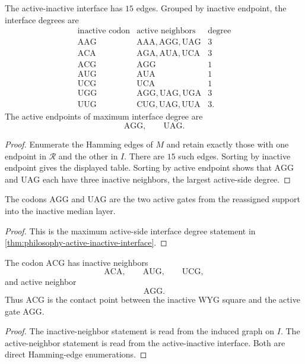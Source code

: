 \begin{theorem}
\label{thm:philosophy-active-inactive-interface}
The active-inactive interface has $15$ edges. Grouped by inactive
endpoint, the interface degrees are
$$
\begin{array}{c|l|r}
  \text{inactive codon} & \text{active neighbors} & \text{degree}\\
  \hline
  \mathrm{AAG} & \mathrm{AAA},\mathrm{AGG},\mathrm{UAG} & 3\\
  \mathrm{ACA} & \mathrm{AGA},\mathrm{AUA},\mathrm{UCA} & 3\\
  \mathrm{ACG} & \mathrm{AGG} & 1\\
  \mathrm{AUG} & \mathrm{AUA} & 1\\
  \mathrm{UCG} & \mathrm{UCA} & 1\\
  \mathrm{UGG} & \mathrm{AGG},\mathrm{UAG},\mathrm{UGA} & 3\\
  \mathrm{UUG} & \mathrm{CUG},\mathrm{UAG},\mathrm{UUA} & 3.
\end{array}
$$
The active endpoints of maximum interface degree are
$$
  \mathrm{AGG},\qquad \mathrm{UAG}.
$$
\end{theorem}
\begin{proof}
Enumerate the Hamming edges of $M$ and retain exactly those with one
endpoint in $\mathcal{R}$ and the other in $I$. There are $15$ such
edges. Sorting by inactive endpoint gives the displayed table. Sorting
by active endpoint shows that $\mathrm{AGG}$ and $\mathrm{UAG}$ each
have three inactive neighbors, the largest active-side degree.
\end{proof}

\begin{corollary}
\label{cor:philosophy-double-gate-inactive-layer}
The codons $\mathrm{AGG}$ and $\mathrm{UAG}$ are the two active gates
from the reassigned support into the inactive median layer.
\end{corollary}
\begin{proof}
This is the maximum active-side interface degree statement in
\autoref{thm:philosophy-active-inactive-interface}.
\end{proof}

\begin{theorem}
\label{thm:philosophy-acg-inactive-square-contact}
The codon $\mathrm{ACG}$ has inactive neighbors
$$
  \mathrm{ACA},\qquad \mathrm{AUG},\qquad \mathrm{UCG},
$$
and active neighbor
$$
  \mathrm{AGG}.
$$
Thus $\mathrm{ACG}$ is the contact point between the inactive
$\mathrm{WYG}$ square and the active gate $\mathrm{AGG}$.
\end{theorem}
\begin{proof}
The inactive-neighbor statement is read from the induced graph on $I$.
The active-neighbor statement is read from the active-inactive
interface. Both are direct Hamming-edge enumerations.
\end{proof}

